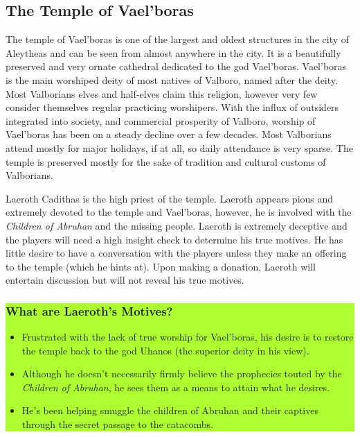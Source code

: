 \begin{multicols*}{2}
\subsection{The Temple of Vael'boras}
The temple of Vael'boras is one of the largest and oldest structures in the city of Aleytheas and can be seen from almost anywhere in the city. It is a beautifully preserved and very ornate cathedral dedicated to the god Vael'boras. Vael'boras is the main worshiped deity of most natives of Valboro, named after the deity. Most Valborians elves and half-elves claim this religion, however very few consider themselves regular practicing worshipers. With the influx of outsiders integrated into society, and commercial prosperity of Valboro, worship of Vael'boras has been on a steady decline over a few decades. Most Valborians attend mostly for major holidays, if at all, so daily attendance is very sparse. The temple is preserved mostly for the sake of tradition and cultural customs of Valborians.

Laeroth Cadithas is the high priest of the temple. Laeroth appears pious and extremely devoted to the temple and Vael'boras, however, he is involved with the \emph{Children of Abruhan} and the missing people. Laeroth is extremely deceptive and the players will need a high insight check to determine his true motives. He has little desire to have a conversation with the players unless they make an offering to the temple (which he hints at). Upon making a donation, Laeroth will entertain discussion but will not reveal his true motives.

\colorbox{GreenYellow}{\begin{minipage}{0.4\textwidth}
	\subsubsection*{What are Laeroth's Motives?}
	\begin{itemize}
		\item Frustrated with the lack of true worship for Vael'boras, his desire is to restore the temple back to the god Uhanos (the superior deity in his view).
		\item Although he doesn't necessarily firmly believe the prophecies touted by the \emph{Children of Abruhan}, he sees them as a means to attain what he desires.
		\item He's been helping smuggle the children of Abruhan and their captives through the secret passage to the catacombs.   
	\end{itemize}
\end{minipage}}
\break


\end{multicols*}
